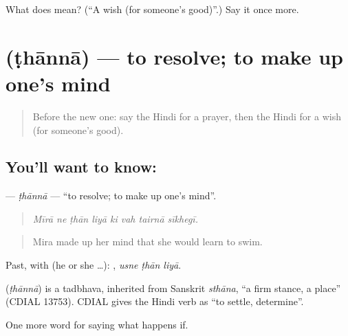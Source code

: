 \begin{tcolorbox}[breakable,colback=teal!4,colframe=teal!35!black,title={Before you move on}]
What does  mean? (\textquotedblleft{}A wish (for someone's good)\textquotedblright{}.) Say it once more.
\end{tcolorbox}
\section[\texorpdfstring{\hi{ठानना} (ṭhānnā)}{ठानना (ṭhānnā)}]{ (ṭhānnā) — to resolve; to make up one's mind}

\label{lesson:HI-C539-thanna}



\begin{quote}
Before the new one: say the Hindi for a prayer, then the Hindi for a wish (for someone's good).
\end{quote}

\subsection*{You'll want to know: }
\textbf{} — \emph{ṭhānnā} — \textquotedblleft{}to resolve; to make up one's mind\textquotedblright{}.

\begin{quote}
       
\end{quote}

\begin{quote}
\emph{Mīrā ne ṭhān liyā ki vah tairnā sīkhegī.}
\end{quote}

\begin{quote}
Mira made up her mind that she would learn to swim.
\end{quote}

Past, with  (he or she …):   , \emph{usne ṭhān liyā}.

\begin{cousinweb}
\textbf{} (\emph{ṭhānnā}) is a tadbhava, inherited from Sanskrit \emph{sthāna}, \textquotedblleft{}a firm stance, a place\textquotedblright{} (CDIAL 13753). CDIAL gives the Hindi verb as \textquotedblleft{}to settle, determine\textquotedblright{}.
\end{cousinweb}

\begin{grammarlens}[title={What you've built}]
One more word for saying what happens if.
\end{grammarlens}

